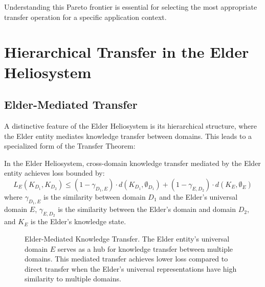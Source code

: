 Understanding this Pareto frontier is essential for selecting the most appropriate transfer operation for a specific application context.

\section{Hierarchical Transfer in the Elder Heliosystem}

\subsection{Elder-Mediated Transfer}

A distinctive feature of the Elder Heliosystem is its hierarchical structure, where the Elder entity mediates knowledge transfer between domains. This leads to a specialized form of the Transfer Theorem:

\begin{theorem}
In the Elder Heliosystem, cross-domain knowledge transfer mediated by the Elder entity achieves loss bounded by:
\begin{equation}
L_{E}(K_{D_1}, K_{D_2}) \leq (1 - \gamma_{D_1,E}) \cdot d(K_{D_1}, \emptyset_{D_1}) + (1 - \gamma_{E,D_2}) \cdot d(K_{E}, \emptyset_{E})
\end{equation}
where $\gamma_{D_1,E}$ is the similarity between domain $D_1$ and the Elder's universal domain $E$, $\gamma_{E,D_2}$ is the similarity between the Elder's domain and domain $D_2$, and $K_E$ is the Elder's knowledge state.
\end{theorem}

\begin{figure}[ht]
    \centering

    \caption{Elder-Mediated Knowledge Transfer. The Elder entity's universal domain $E$ serves as a hub for knowledge transfer between multiple domains. This mediated transfer achieves lower loss compared to direct transfer when the Elder's universal representations have high similarity to multiple domains.}
    \label{fig:elder_mediated_transfer}
\end{figure}

